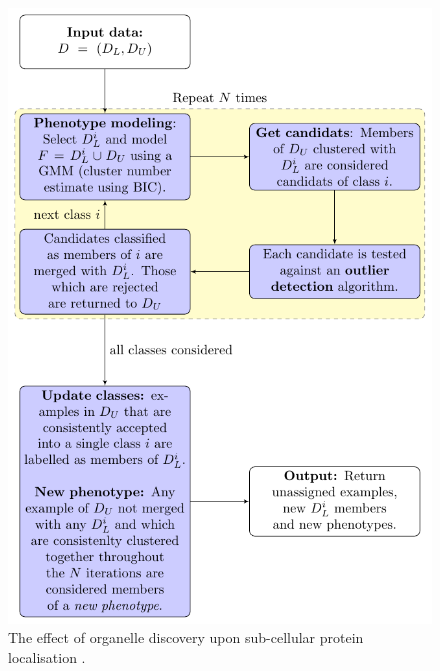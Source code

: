 \begin{frame}{}
  \begin{figure}
    \includegraphics[width=.48\linewidth]{figs_more/phenodisco.pdf}
    \caption{The effect of organelle discovery upon sub-cellular protein
      localisation \cite{Breckels:2013}.}
  \end{figure}
\end{frame}



